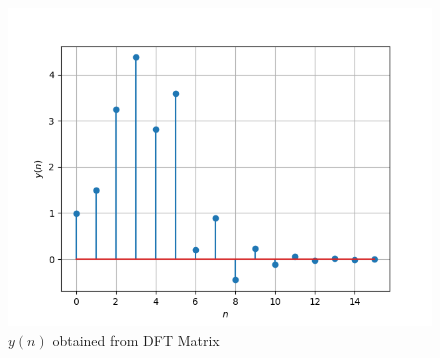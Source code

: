 \documentclass[journal,12pt,twocolumn]{IEEEtran}
\theoremstyle{remark}
\begin{document}
\begin{enumerate}[label=\thesection.\arabic*,ref=\thesection.\theenumi]
\begin{figure}[H]
\includegraphics[width=\columnwidth]{figs/yn_DFT_matrix.png}
\caption{$y(n)$ obtained from DFT Matrix}
\label{fig:yn_DFT_matrix}
\end{figure}

\end{enumerate}
\end{document}

